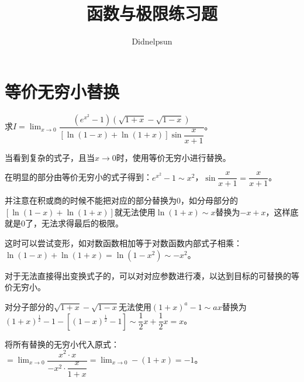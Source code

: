 \documentclass[UTF8]{ctexart}
\author{Didnelpsun}
\title{函数与极限练习题}
\date{}
\begin{document}
\maketitle
\thispagestyle{empty}
\tableofcontents
\thispagestyle{empty}
\newpage
\pagestyle{plain}
\setcounter{page}{1}
\section{等价无穷小替换}

求$I=\lim_{x\to 0}\dfrac{(e^{x^2}-1)(\sqrt{1+x}-\sqrt{1-x})}{[\ln(1-x)+\ln(1+x)]\sin\dfrac{x}{x+1}}$。

当看到复杂的式子，且当$x\to 0$时，使用等价无穷小进行替换。

在明显的部分由等价无穷小的式子得到：$e^{x^2}-1\sim x^2$，$\sin\dfrac{x}{x+1}=\dfrac{x}{x+1}$。

并注意在积或商的时候不能把对应的部分替换为0，如分母部分的$[\ln(1-x)+\ln(1+x)]$就无法使用$\ln(1+x)\sim x$替换为$-x+x$，这样底就是0了，无法求得最后的极限。

这时可以尝试变形，如对数函数相加等于对数函数内部式子相乘：$\ln(1-x)+\ln(1+x)=\ln(1-x^2)\sim-x^2$。

对于无法直接得出变换式子的，可以对对应参数进行凑，以达到目标的可替换的等价无穷小。

对分子部分的$\sqrt{1+x}-\sqrt{1-x}$无法使用$(1+x)^a-1\sim ax$替换为$(1+x)^{\frac{1}{2}}-1-[(1-x)^{\frac{1}{2}}-1]\sim\dfrac{1}{2}x+\dfrac{1}{2}x=x$。

将所有替换的无穷小代入原式：$=\lim_{x\to 0}\dfrac{x^2\cdot x}{-x^2\cdot\dfrac{x}{1+x}}=\lim_{x\to 0}-(1+x)=-1$。
\end{document}
